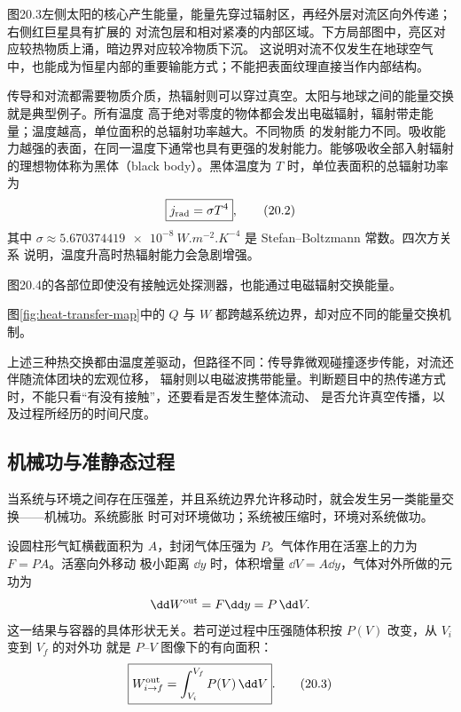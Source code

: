 \stellarInteriorRevision
{}
图20.3左侧太阳的核心产生能量，能量先穿过辐射区，再经外层对流区向外传递；右侧红巨星具有扩展的
对流包层和相对紧凑的内部区域。下方局部图中，亮区对应较热物质上涌，暗边界对应较冷物质下沉。
这说明对流不仅发生在地球空气中，也能成为恒星内部的重要输能方式；不能把表面纹理直接当作内部结构。

传导和对流都需要物质介质，热辐射则可以穿过真空。太阳与地球之间的能量交换就是典型例子。所有温度
高于绝对零度的物体都会发出电磁辐射，辐射带走能量；温度越高，单位面积的总辐射功率越大。不同物质
的发射能力不同。吸收能力越强的表面，在同一温度下通常也具有更强的发射能力。能够吸收全部入射辐射
的理想物体称为黑体（black body）。黑体温度为 $T$ 时，单位表面积的总辐射功率为
\begin{equation}
  \boxed{j_{\rm rad}=\sigma T^4}, \tag{20.2}
\end{equation}
其中 $\sigma\approx\SI{5.670374419e-8}{W.m^{-2}.K^{-4}}$ 是 Stefan--Boltzmann 常数。四次方关系
说明，温度升高时热辐射能力会急剧增强。

图20.4的各部位即使没有接触远处探测器，也能通过电磁辐射交换能量。

\heatTransferMapDiagram
{}\label{fig:heat-transfer-map}
图\ref{fig:heat-transfer-map}中的 $Q$ 与 $W$ 都跨越系统边界，却对应不同的能量交换机制。

上述三种热交换都由温度差驱动，但路径不同：传导靠微观碰撞逐步传能，对流还伴随流体团块的宏观位移，
辐射则以电磁波携带能量。判断题目中的热传递方式时，不能只看“有没有接触”，还要看是否发生整体流动、
是否允许真空传播，以及过程所经历的时间尺度。

\subsection*{机械功与准静态过程}

当系统与环境之间存在压强差，并且系统边界允许移动时，就会发生另一类能量交换——机械功。系统膨胀
时可对环境做功；系统被压缩时，环境对系统做功。

设圆柱形气缸横截面积为 $A$，封闭气体压强为 $P$。气体作用在活塞上的力为 $F=PA$。活塞向外移动
极小距离 $\dd y$ 时，体积增量 $\dd V=A\dd y$，气体对外所做的元功为
\begin{equation*}
  \dd W^{\rm out}=F\dd y=P\,\dd V.
\end{equation*}
这一结果与容器的具体形状无关。若可逆过程中压强随体积按 $P(V)$ 改变，从 $V_i$ 变到 $V_f$ 的对外功
就是 $P$--$V$ 图像下的有向面积：
\begin{equation}
  \boxed{W^{\rm out}_{i\to f}=\int_{V_i}^{V_f}P(V)\,\dd V}. \tag{20.3}
\end{equation}

